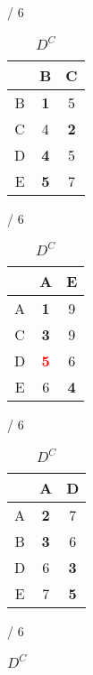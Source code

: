 \documentclass[a4paper, 11 pt, article, accentcolor=tud7b]{tudreport}
\begin{document}
	\begin{table}[h]
	  \begin{subtable}[b]{\textwidth / 6}
	    \begin{tabular}{| c | c | c |}
	      \hline
	        & B                   & C          \\ \hline
	      B & \textbf{1}          & 5          \\ \hline
	      C & 4                   & \textbf{2} \\ \hline
	      D & \textbf{4}          & 5          \\ \hline
	      E & \textbf{5}          & 7          \\ \hline
	    \end{tabular}
	    \caption{$D^{A}$}
	  \end{subtable}
	  \hfill
	  \begin{subtable}[b]{\textwidth / 6}
	    \begin{tabular}{| c | c | c |}
	    \hline
	      & A                   & E                  \\ \hline
	    A & \textbf{1}          & 9                  \\ \hline
	    C & \textbf{3}          & 9                  \\ \hline
	    D & \textbf{\textcolor{red}{5}} & 6          \\ \hline
	    E & 6                   & \textbf{4}         \\ \hline
	    \end{tabular}
	    \caption{$D^{B}$}
	  \end{subtable}
	  \hfill
	  \begin{subtable}[b]{\textwidth / 6}
	    \begin{tabular}{| c | c | c |}
	    \hline
	      & A                   & D                  \\ \hline
	    A & \textbf{2}          & 7                  \\ \hline
	    B & \textbf{3}          & 6                  \\ \hline
	    D & 6                   & \textbf{3}         \\ \hline
	    E & 7                   & \textbf{5}         \\ \hline
	    \end{tabular}
	    \caption{$D^{C}$}
	  \end{subtable}
    \hfill
	  \begin{subtable}[b]{\textwidth / 6}
	    \begin{tabular}{| c | c | c |}

\end{tabular}
\end{subtable}
\end{table}
\end{document}
